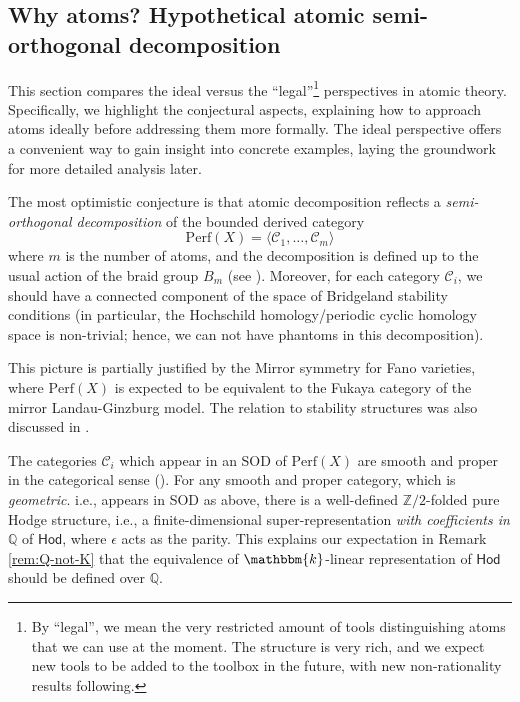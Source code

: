 \documentclass[12pt,a4paper]{amsart}
\theoremstyle{definition}
\theoremstyle{remark}
\newcommand{\Q}{\mathbb{Q}}
\newcommand{\Z}{\mathbb{Z}}
\begin{document}

\subsection{Why atoms? Hypothetical atomic semi-orthogonal decomposition}
\label{sec:ideal-legal}
This section compares the ideal versus the ``legal''\footnote{By ``legal'', we mean the very restricted amount of tools distinguishing atoms that we can use at the moment. The structure is very rich, and we expect new tools to be added to the toolbox in the future, with new non-rationality results following.} perspectives in atomic theory. Specifically, we highlight the conjectural aspects, explaining how to approach atoms ideally before addressing them more formally. The ideal perspective offers a convenient way to gain insight into concrete examples, laying the groundwork for more detailed analysis later. 

The most optimistic conjecture is that atomic decomposition reflects a \emph{semi-orthogonal decomposition} of the bounded derived category $$\mathrm{Perf}(X)=\langle \mathcal C_1,\ldots,\mathcal C_m\rangle $$
where $m$ is the number of atoms, and the decomposition is defined up to the usual action of the braid group $B_m$ (see \cite{Bondal1990}).
Moreover, for each category $\mathcal C_i$, we should have a connected component of the space of Bridgeland stability conditions (in particular, the Hochschild homology/periodic cyclic homology space is non-trivial; hence, we can not have phantoms \cite{Bhning2015} in this decomposition).

This picture is partially justified by the Mirror symmetry for Fano varieties, where $\mathrm{Perf}(X)$ is expected to be equivalent to the Fukaya category of the mirror Landau-Ginzburg model. The relation to stability structures was also discussed in \cite{Blum2021}.

The categories ${\mathcal C}_i$ which appear in an SOD of $\mathrm{Perf}(X)$ are smooth and proper in the categorical sense (\cites{Kontsevich2008, Tabuada2015-tu}). For any smooth and proper category, which is \emph{geometric}. i.e., appears in SOD as above, there is a well-defined $\Z/2$-folded pure Hodge structure, i.e., a finite-dimensional super-representation \emph{with coefficients in $\Q$} of $\mathsf{Hod}$, where $\epsilon$ acts as the parity.   This explains our expectation in Remark \ref{rem:Q-not-K} that the equivalence of $\mathbbm{k}$-linear representation of $\mathsf{Hod}$ should be defined over $\Q$.    
\end{document}
